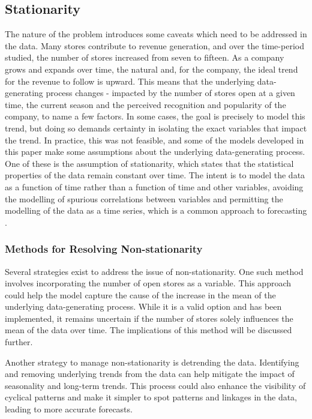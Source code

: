 \subsection{Stationarity}
The nature of the problem introduces some caveats which need to be addressed in
the data. Many stores contribute to revenue generation, and over the
time-period studied, the number of stores increased from seven to fifteen. As a
company grows and expands over time, the natural and, for the company, the
ideal trend for the revenue to follow is upward. This means that the underlying
data-generating process changes - impacted by the number of stores open at a
given time, the current season and the perceived recognition and popularity of
the company, to name a few factors. In some cases, the goal is precisely to
model this trend, but doing so demands certainty in isolating the exact
variables that impact the trend. In practice, this was not feasible, and some
of the models developed in this paper make some assumptions about the
underlying data-generating process. One of these is the assumption of
stationarity, which states that the statistical properties of the data remain
constant over time. The intent is to model the data as a function of time
rather than a function of time and other variables, avoiding the modelling of
spurious correlations between variables and permitting the modelling of the
data as a time series, which is a common approach to forecasting
\cite{time-series1}.


\subsubsection{Methods for Resolving Non-stationarity}

Several strategies exist to address the issue of non-stationarity. One such
method involves incorporating the number of open stores as a variable. This
approach could help the model capture the cause of the increase in the mean of
the underlying data-generating process. While it is a valid option and has been
implemented, it remains uncertain if the number of stores solely influences the
mean of the data over time. The implications of this method will be discussed
further.

Another strategy to manage non-stationarity is detrending the data. Identifying
and removing underlying trends from the data can help mitigate the impact of
seasonality and long-term trends. This process could also enhance the
visibility of cyclical patterns and make it simpler to spot patterns and
linkages in the data, leading to more accurate forecasts.

